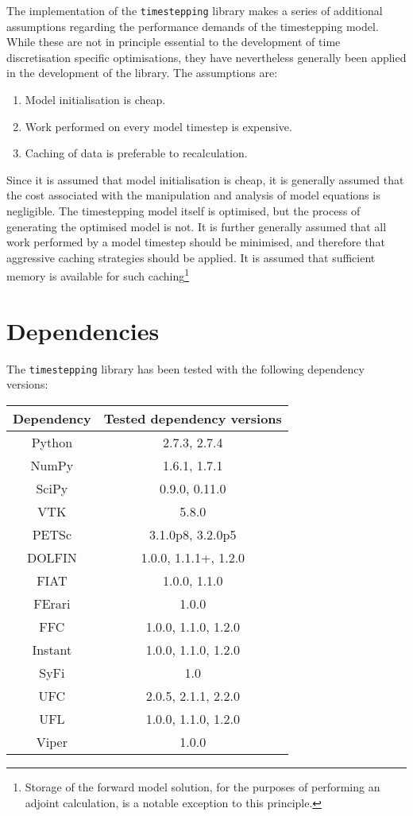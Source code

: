 \documentclass[a4paper]{book}
\begin{document}
The implementation of the \verb+timestepping+ library makes a series of
additional assumptions regarding the performance demands of the timestepping
model. While these are not in principle essential to the development of time
discretisation specific optimisations, they have nevertheless generally been
applied in the development of the library. The assumptions are:
\begin{enumerate}
  \item Model initialisation is cheap.
  \item Work performed on every model timestep is expensive.
  \item Caching of data is preferable to recalculation.
\end{enumerate}
Since it is assumed that model initialisation is cheap, it is generally assumed
that the cost associated with the manipulation and analysis of model equations
is negligible. The timestepping model itself is optimised, but the process of
generating the optimised model is not. It is further generally assumed that
all work performed by a model timestep should be minimised, and therefore
that aggressive caching strategies should be applied. It is assumed that
sufficient memory is available for such caching\footnote{Storage of the forward
model solution, for the purposes of performing an adjoint calculation, is a
notable exception to this principle.}

\section{Dependencies}

The \verb+timestepping+ library has been tested with the following dependency
versions:

\begin{center}
\begin{tabular}{| c | c | }
\hline
Dependency  & Tested dependency versions \\
\hline
Python  & 2.7.3, 2.7.4 \\
\hline
NumPy  & 1.6.1, 1.7.1 \\
SciPy  & 0.9.0, 0.11.0 \\
VTK    & 5.8.0 \\
PETSc  & 3.1.0p8, 3.2.0p5 \\
\hline
DOLFIN   & 1.0.0, 1.1.1+, 1.2.0 \\
FIAT     & 1.0.0, 1.1.0 \\
FErari   & 1.0.0 \\
FFC      & 1.0.0, 1.1.0, 1.2.0 \\
Instant  & 1.0.0, 1.1.0, 1.2.0 \\
SyFi     & 1.0 \\
UFC      & 2.0.5, 2.1.1, 2.2.0 \\
UFL      & 1.0.0, 1.1.0, 1.2.0 \\
Viper    & 1.0.0 \\
\hline
\end{tabular}
\end{center}
\end{document}
